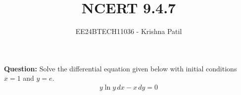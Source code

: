 \documentclass[journal]{IEEEtran}
\begin{document}

\vspace{3cm}

\title{NCERT 9.4.7}
\author{EE24BTECH11036 - Krishna Patil}
{\let\newpage\relax\maketitle}

\renewcommand{\thefigure}{\theenumi}
\renewcommand{\thetable}{\theenumi}
\setlength{\intextsep}{10pt} %

\textbf{Question:} Solve the differential equation given below with initial conditions $ x = 1 $ and $ y = e $.
\begin{align}
	y \ln{y} \, dx - x \, dy = 0
\end{align}
\solution 
\end{document}
